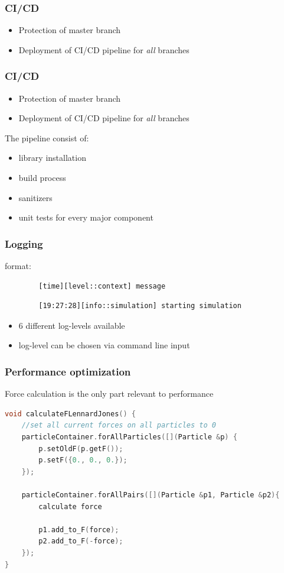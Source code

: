 \begin{frame}
	\frametitle{CI/CD}
	\large
	\begin{itemize}
		\item<1-> Protection of master branch
		\item<2-> Deployment of CI/CD pipeline for \textit{all} branches 
	\end{itemize}
	
\end{frame}


\begin{frame}
	\frametitle{CI/CD}
	\large
	\begin{itemize}
		\item Protection of master branch
		\item Deployment of CI/CD pipeline for \textit{all} branches 
	\end{itemize}
	\Large
	The pipeline consist of:
	\large
	\begin{itemize}
		\item<1-> library installation
		\item<2-> build process
		\item<3-> sanitizers
		\item<4-> unit tests for every major component
	\end{itemize}
\end{frame}

\begin{frame}[fragile]
	\frametitle{Logging}
	\large
	format:
	\hspace{-4cm}
	\begin{lstlisting}
		[time][level::context] message
	\end{lstlisting}
	\begin{lstlisting}
		[19:27:28][info::simulation] starting simulation
	\end{lstlisting}
	\begin{itemize}
		\item 6 different log-levels available
		\item log-level can be chosen via command line input
	\end{itemize}
\end{frame}

\begin{frame}[fragile]
	\frametitle{Performance optimization}
	\large
	Force calculation is the only part relevant to performance
	\begin{lstlisting}[language=C++]
    void calculateFLennardJones() {
	//set all current forces on all particles to 0
	particleContainer.forAllParticles([](Particle &p) {
		p.setOldF(p.getF());
		p.setF({0., 0., 0.});
	});
	
	particleContainer.forAllPairs([](Particle &p1, Particle &p2){
		calculate force 
		
		p1.add_to_F(force);
		p2.add_to_F(-force);
	});
}

	\end{lstlisting}

\end{frame}

